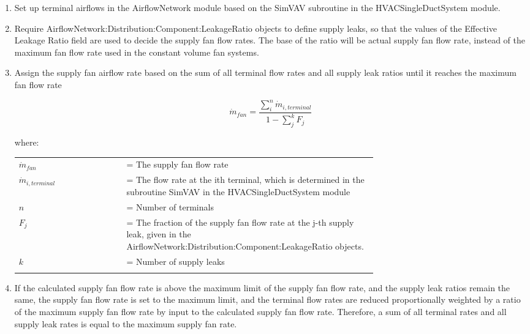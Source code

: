 \begin{enumerate}
\item Set up terminal airflows in the AirflowNetwork module based on the SimVAV subroutine in the HVACSingleDuctSystem module.
\item Require AirflowNetwork:Distribution:Component:LeakageRatio objects to define supply leaks, so that the values of the Effective Leakage Ratio field are used to decide the supply fan flow rates. The base of the ratio will be actual supply fan flow rate, instead of the maximum fan flow rate used in the constant volume fan systems.
\item Assign the supply fan airflow rate based on the sum of all terminal flow rates and all supply leak ratios until it reaches the maximum fan flow rate

\begin{equation}
\dot{m}_{fan} = \frac{\sum_i^n \dot{m}_{i,terminal}}{1 - \sum_j^k F_j}
\end{equation}

where:

\begin{tabular}{lp{0.7\linewidth}}
\\
$\dot{m}_{fan}$ &= The supply fan flow rate\\
$\dot{m}_{i,terminal}$ &= The flow rate at the ith terminal, which is determined in the subroutine SimVAV in the HVACSingleDuctSystem module\\
$n$ &= Number of terminals\\
$F_j$ &= The fraction of the supply fan flow rate at the j-th supply leak, given in the AirflowNetwork:Distribution:Component:LeakageRatio objects.\\
$k$ &= Number of supply leaks\\
\\
\end{tabular}

\item If the calculated supply fan flow rate is above the maximum limit of the supply fan flow rate, and the supply leak ratios remain the same, the supply fan flow rate is set to the maximum limit, and the terminal flow rates are reduced proportionally weighted by a ratio of the maximum supply fan flow rate by input to the calculated supply fan flow rate. Therefore, a sum of all terminal rates and all supply leak rates is equal to the maximum supply fan rate.

\end{enumerate}

